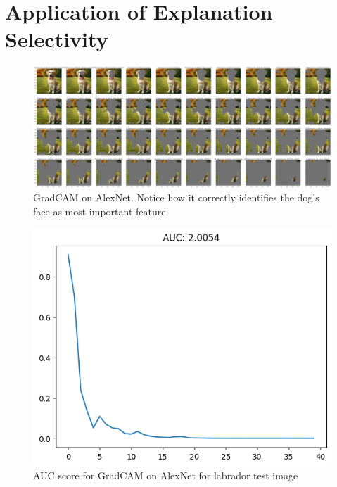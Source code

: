 \documentclass{article}
\begin{document}
\section{Application of Explanation Selectivity}
\begin{figure}
    \centering
    \includegraphics[width=1\linewidth]{results/gradcam-labrador-feature-removal.png}
    \caption{GradCAM on AlexNet. Notice how it correctly identifies the dog's face as most important feature.}
    \label{fig:gradcam-labrador-feature-removal}
\end{figure}


\begin{figure}
    \centering
    \includegraphics[width=1\linewidth]{results/gradcam-labrador-auc.png}
    \caption{AUC score for GradCAM on AlexNet for labrador test image}
    \label{fig:gradcam-labrador-auc}
\end{figure}
\end{document}
